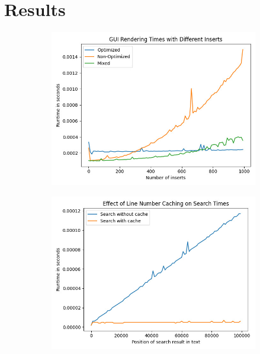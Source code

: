 \section{Results}\label{sec:results}
\begin{figure}[H]
\centering
\begin{subfigure}[b]{0.3\textwidth}
    \centering
    \includegraphics[width=\textwidth]{./images/Profiler-Render-Metric-Size1.jpg}
    \label{fig:renderMetric}
\end{subfigure}
\hfill
\begin{subfigure}[b]{0.3\textwidth}
    \centering
    \includegraphics[width=\textwidth]{./images/Profiler-Find-Caching.jpg}

\end{subfigure}
\end{figure}
